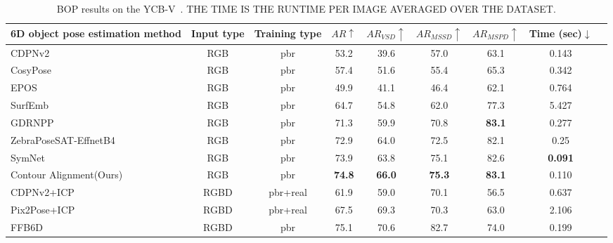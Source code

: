 \begin{sidewaystable}[ht]
        \centering
        \caption{
                BOP results on the YCB-V~\cite{xiang2018posecnn}. THE TIME IS THE RUNTIME PER IMAGE AVERAGED OVER THE DATASET.
        }
        \begin{tabular}{l c c c c c c c c}
        \toprule
        6D object pose estimation method &Input type&Training type&$AR\uparrow$&$AR_{VSD}\uparrow$&$AR_{MSSD}\uparrow$&$AR_{MSPD}\uparrow$&Time (sec)$\downarrow$\\       %
        \midrule
        CDPNv2~\cite{li2019cdpn}&RGB&pbr&53.2&39.6&57.0&63.1&0.143 \\
        CosyPose~\cite{labbe2020cosypose}&RGB&pbr&57.4&51.6&55.4&65.3&0.342\\
        EPOS~\cite{hodan2020epos}&RGB&pbr&49.9&41.1&46.4&62.1&0.764 \\
        SurfEmb~\cite{haugaard2022surfemb}&RGB&pbr&64.7&54.8&62.0&77.3&5.427 \\
        GDRNPP~\cite{wang2021gdr}&RGB&pbr&71.3&59.9&70.8&\textbf{83.1}&0.277\\
        ZebraPoseSAT-EffnetB4~\cite{su2022zebrapose}&RGB&pbr&72.9&64.0&72.5&82.1&0.25 \\
        SymNet~\cite{symnet}&RGB&pbr&73.9&63.8&75.1&82.6&\textbf{0.091} \\
        Contour Alignment(Ours)&RGB&pbr&\textbf{74.8}&\textbf{66.0}&\textbf{75.3}&\textbf{83.1}&0.110\\
        \midrule
        CDPNv2+ICP~\cite{li2019cdpn}&RGBD&pbr+real&61.9&59.0&70.1&56.5&0.637\\
        Pix2Pose+ICP~\cite{park2019pix2pose}&RGBD&pbr+real&67.5&69.3&70.3&63.0&2.106\\
        \midrule
        FFB6D~\cite{he2021ffb6d}&RGBD&pbr&75.1&70.6&82.7&74.0&0.199\\
        \bottomrule
        \end{tabular}
\label{tab:ycbv_bop}
\end{sidewaystable}
